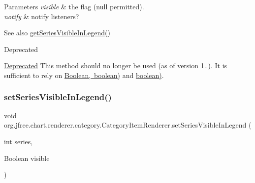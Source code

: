 \begin{DoxyParams}{Parameters}
{\em visible} & the flag ({\ttfamily null} permitted). \\
\hline
{\em notify} & notify listeners?\\
\hline
\end{DoxyParams}
\begin{DoxySeeAlso}{See also}
\mbox{\hyperlink{interfaceorg_1_1jfree_1_1chart_1_1renderer_1_1category_1_1_category_item_renderer_a702f01f7f6b883405e393e74ea16a129}{get\+Series\+Visible\+In\+Legend()}}
\end{DoxySeeAlso}
\begin{DoxyRefDesc}{Deprecated}
\item[\mbox{\hyperlink{deprecated__deprecated000158}{Deprecated}}]This method should no longer be used (as of version 1..). It is sufficient to rely on \mbox{\hyperlink{}{Boolean, boolean)}} and \mbox{\hyperlink{interfaceorg_1_1jfree_1_1chart_1_1renderer_1_1category_1_1_category_item_renderer_a2581902144013c603baed487e99eb7bd}{boolean)}}. \end{DoxyRefDesc}
\mbox{\label{interfaceorg_1_1jfree_1_1chart_1_1renderer_1_1category_1_1_category_item_renderer_a49a49aaa13e05a123ae9808c3f0cb5c8}} 
\subsubsection{\texorpdfstring{set\+Series\+Visible\+In\+Legend()}{setSeriesVisibleInLegend()}\hspace{0.1cm}{\footnotesize\ttfamily [3/4]}}
{\footnotesize\ttfamily void org.\+jfree.\+chart.\+renderer.\+category.\+Category\+Item\+Renderer.\+set\+Series\+Visible\+In\+Legend (\begin{DoxyParamCaption}\item[{int}]{series,  }\item[{Boolean}]{visible }\end{DoxyParamCaption})}

